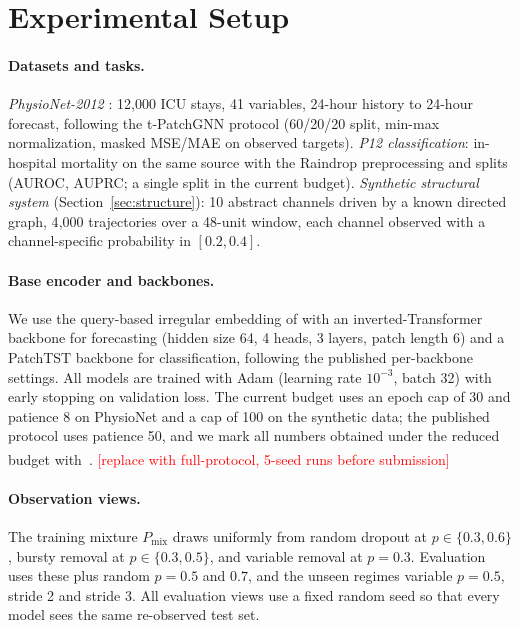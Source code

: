 \documentclass[sigconf,nonacm]{acmart}
\newcommand{\todo}[1]{\textcolor{red}{[#1]}}
\newcommand{\prelim}{\textsuperscript{\dag}}
\begin{document}
\section{Experimental Setup}
\label{sec:setup}
\paragraph{Datasets and tasks.}
\emph{PhysioNet-2012} \cite{silva2012physionet}: 12{,}000 ICU stays, 41 variables, 24-hour history to 24-hour
forecast, following the t-PatchGNN protocol \cite{zhang2024tpatchgnn} (60/20/20 split, min-max normalization,
masked MSE/MAE on observed targets). \emph{P12 classification}: in-hospital mortality on the same source with the
Raindrop preprocessing and splits \cite{zhang2022raindrop} (AUROC, AUPRC; a single split in the current budget).
\emph{Synthetic structural system} (Section~\ref{sec:structure}): 10 abstract channels driven by a known directed
graph, 4{,}000 trajectories over a 48-unit window, each channel observed with a channel-specific probability in
$[0.2,0.4]$.

\paragraph{Base encoder and backbones.}
We use the query-based irregular embedding of \cite{lim2026quite} with an inverted-Transformer backbone
\cite{liu2024itransformer} for forecasting (hidden size 64, 4 heads, 3 layers, patch length 6) and a PatchTST
backbone \cite{nie2023patchtst} for classification, following the published per-backbone settings. All models are
trained with Adam (learning rate $10^{-3}$, batch 32) with early stopping on validation loss. The current budget
uses an epoch cap of 30 and patience 8 on PhysioNet and a cap of 100 on the synthetic data; the published protocol
uses patience 50, and we mark all numbers obtained under the reduced budget with~\prelim. \todo{replace with
full-protocol, 5-seed runs before submission}

\paragraph{Observation views.}
The training mixture $P_{\mathrm{mix}}$ draws uniformly from random dropout at $p\in\{0.3,0.6\}$, bursty removal
at $p\in\{0.3,0.5\}$, and variable removal at $p=0.3$. Evaluation uses these plus random $p=0.5$ and $0.7$, and the
unseen regimes variable $p=0.5$, stride 2 and stride 3. All evaluation views use a fixed random seed so that every
model sees the same re-observed test set.
\end{document}
